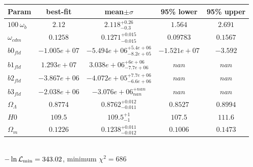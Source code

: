 \begin{tabular}{|l|c|c|c|c|} 
 \hline 
Param & best-fit & mean$\pm\sigma$ & 95\% lower & 95\% upper \\ \hline 
$100~\omega_{b }$ &$2.12$ & $2.118_{-0.3}^{+0.26}$ & $1.564$ & $2.691$ \\ 
$\omega_{cdm }$ &$0.1258$ & $0.1271_{-0.015}^{+0.015}$ & $0.09783$ & $0.1567$ \\ 
$b0_{fld }$ &$-1.005e+07$ & $-5.494e+06_{-8.2e+05}^{+5.4e+06}$ & $-1.521e+07$ & $-3.592$ \\ 
$b1_{fld }$ &$1.293e+07$ & $3.038e+06_{-7.7e+06}^{+6e+06}$ & $nan$ & $nan$ \\ 
$b2_{fld }$ &$-3.867e+06$ & $-4.072e+05_{-6.6e+06}^{+7.7e+06}$ & $nan$ & $nan$ \\ 
$b3_{fld }$ &$-2.038e+06$ & $-3.076e+06_{nan}^{+nan}$ & $nan$ & $nan$ \\ 
$\Omega_{\Lambda }$ &$0.8774$ & $0.8762_{-0.011}^{+0.012}$ & $0.8527$ & $0.8994$ \\ 
$H0$ &$109.5$ & $109.5_{-1}^{+1}$ & $107.5$ & $111.6$ \\ 
$\Omega_{m }$ &$0.1226$ & $0.1238_{-0.012}^{+0.011}$ & $0.1006$ & $0.1473$ \\ 
\hline 
 \end{tabular} \\ 
$-\ln{\cal L}_\mathrm{min} =343.02$, minimum $\chi^2=686$ \\ 
